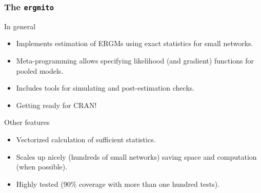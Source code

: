 \documentclass[aspectratio=169, 9pt]{beamer}
\newcommand{\ergmitopkg}[0]{\texttt{ergmito}}
\begin{document}
\begin{frame}[label=ergmitopkg]
\frametitle{The \ergmitopkg{}}

In general

\begin{itemize}
\item Implements estimation of ERGMs using exact statistics for small networks.
\item Meta-programming allows specifying likelihood (and gradient) functions for
pooled models.%
\item Includes tools for simulating and post-estimation checks.
\item Getting ready for CRAN!
\end{itemize}\pause

Other features

\begin{itemize}
\item Vectorized calculation of sufficient statistics.
\item Scales up nicely (hundreds of small networks) saving space and computation (when possible).
\item Highly tested (90\% coverage with more than one hundred tests).
\end{itemize}


\end{frame}

\end{document}
